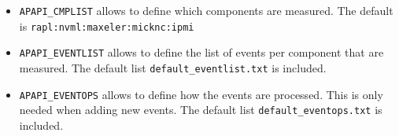 \begin{itemize}
\item \verb+APAPI_CMPLIST+ allows to define which components are measured.
The default is \verb+rapl:nvml:maxeler:micknc:ipmi+
\item \verb+APAPI_EVENTLIST+ allows to define the list of events per component that are measured.
The default list \verb+default_eventlist.txt+ is included.
\item \verb+APAPI_EVENTOPS+ allows to define how the events are processed.
This is only needed when adding new events.
The default list \verb+default_eventops.txt+ is included.
\end{itemize}


